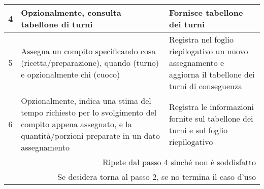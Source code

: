 \begin{table}[H]
\begin{tabular}{|c|p{7cm}|p{6.5cm}|}
        4                  & Opzionalmente, consulta tabellone di turni                                                                                                                    & Fornisce tabellone dei turni                                                                                                                                    \\\hline
        5                  & Assegna un compito specificando cosa (ricetta/preparazione), quando (turno) e opzionalmente chi (cuoco)                                                       & Registra nel foglio riepilogativo un nuovo assegnamento e aggiorna il tabellone dei turni di conseguenza                                                        \\\hline
        6                  & Opzionalmente, indica una stima del tempo richiesto per lo svolgimento del compito appena assegnato, e la quantità/porzioni preparate in un dato assegnamento & Registra le informazioni fornite sul tabellone dei turni e sul foglio riepilogativo                                                                             \\\hline
        \multicolumn{3}{|r|}{Ripete dal passo 4 sinché non è soddisfatto}                                                                                                                                                                                                                                                                                    \\
        \multicolumn{3}{|r|}{Se desidera torna al passo 2, se no termina il caso d’uso}                                                                                                                                                                                                                                                                      \\\hline
    \end{tabular}
\end{table}

